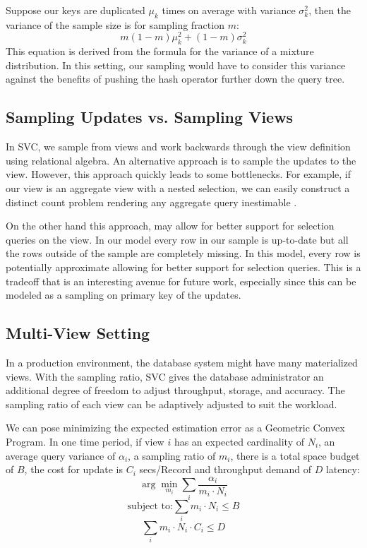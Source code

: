 Suppose our keys are duplicated $\mu_k$ times on average with variance $\sigma_k^2$, then the variance of the
sample size is for sampling fraction $m$:
\[m(1-m)\mu_k^2+(1-m)\sigma_k^2\]
This equation is derived from the formula for the variance of a mixture distribution.
In this setting, our sampling would have to consider this variance against the benefits of pushing the hash operator further down the query tree. 

\subsection{Sampling Updates vs. Sampling Views}
In SVC, we sample from views and work backwards through the view definition using relational algebra.
An alternative approach is to sample the updates to the view. 
However, this approach quickly leads to some bottlenecks.
For example, if our view is an aggregate view with a nested selection, we can easily construct a distinct count problem rendering any aggregate query inestimable \cite{DBLP:conf/pods/CharikarCMN00}.

On the other hand this approach, may allow for better support for selection queries on the view.
In our model every row in our sample is up-to-date but all the rows outside of the sample are completely missing. 
In this model, every row is potentially approximate allowing for better support for selection queries.
This is a tradeoff that is an interesting avenue for future work, especially since this can be modeled as a sampling on primary key of the updates.

\subsection{Multi-View Setting}
In a production environment, the database system might have many materialized views. 
With the sampling ratio, SVC gives the database administrator an additional degree of freedom to adjust throughput, storage, and accuracy.
The sampling ratio of each view can be adaptively adjusted to suit the workload.

We can pose minimizing the expected estimation error as a Geometric Convex Program.
In one time period, if view $i$ has an expected cardinality of $N_i$, an average query variance of $\alpha_i$, a sampling ratio of $m_i$, there is a total space budget of $B$, the cost for update is $C_i$ secs/Record and throughput demand of $D$ latency:
\[\arg \min_{m_i} \sum_i \frac{\alpha_i}{m_i \cdot N_i}\]
\[\text{subject to:} \sum_i m_i \cdot N_i \le B \]
\[\sum_i m_i\cdot N_i \cdot C_i \le D \]




